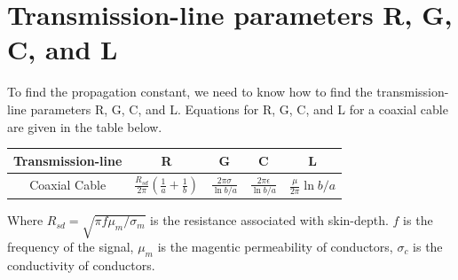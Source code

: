 \documentclass{ximera}
\begin{document}
\section{Transmission-line parameters R, G, C, and L}

To find the propagation constant, we need to know how to find the transmission-line parameters R, G, C, and L. Equations for R, G, C, and L for a coaxial cable are given in the table below. 

\begin{center}
\begin{tabular}{|c|c|c|c|c|} \hline
Transmission-line    & R  & G & C &L     \\  \hline       
Coaxial Cable       & $\frac{R_{sd}}{2 \pi} \left(\frac{1}{a} +  \frac{1}{b} \right)$   & $\frac{2 \pi \sigma}{\ln b/a}$ &$\frac{2 \pi \epsilon}{\ln b/a}$& $\frac{\mu}{2 \pi } \ln b/a$                             \\ \hline    
\end{tabular}
\end{center}

Where $R_{sd} = \sqrt{\pi f \mu_m/\sigma_m}$ is the resistance associated with skin-depth. $f$ is the frequency of the signal, $\mu_m$ is the magentic permeability of conductors, $\sigma_c$ is the conductivity of conductors.
\end{document}
